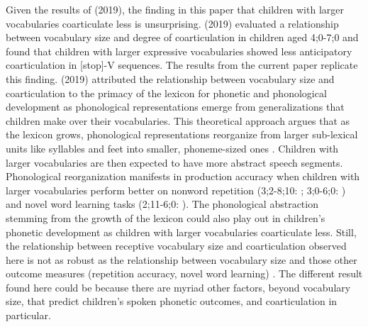 \documentclass[a4paper,man,natbib,donotrepeattitle, apacite]{apa6}
\begin{document}
Given the results of \citeauthor{noiraySpokenLanguageDevelopment2019} (2019), the finding in this paper that children with larger vocabularies coarticulate less is unsurprising. \citeauthor{noiraySpokenLanguageDevelopment2019} (2019) evaluated a relationship between vocabulary size and degree of coarticulation in children aged 4;0-7;0 and found that children with larger expressive vocabularies showed less anticipatory coarticulation in [stop]-V sequences. The results from the current paper replicate this finding. \citeauthor{noiraySpokenLanguageDevelopment2019} (2019) attributed the relationship between vocabulary size and coarticulation to the primacy of the lexicon for phonetic and phonological development as phonological representations emerge from generalizations that children make over their vocabularies.  This theoretical approach argues that as the lexicon grows, phonological representations reorganize from larger sub-lexical units like syllables and feet into smaller, phoneme-sized ones \cite{beckmanGeneralizingLexiconsPredict2010,edwardsInteractionVocabularySize2004,metsalaYoungChildrenPhonological1999,metsalaSpokenVocabularyGrowth1998,storkelInfluencePartwordPhonotactic2011,storkelLexiconPhonologyInteractions2002}. Children with larger vocabularies are then expected to have more abstract speech segments. Phonological reorganization manifests in production accuracy when children with larger vocabularies perform better on nonword repetition (3;2-8;10: ; 3;0-6;0: ) and novel word learning tasks (2;11-6;0: ). The phonological abstraction stemming from the growth of the lexicon could also play out in children’s phonetic development as children with larger vocabularies coarticulate less. Still, the relationship between receptive vocabulary size and coarticulation observed here is not as robust as the relationship between vocabulary size and those other outcome measures (repetition accuracy, novel word learning) \cite{edwardsInteractionVocabularySize2004,metsalaYoungChildrenPhonological1999,storkelInfluencePartwordPhonotactic2011}. The different result found here could be because there are myriad other factors, beyond vocabulary size, that predict children’s spoken phonetic outcomes, and coarticulation in particular. 
\end{document}
